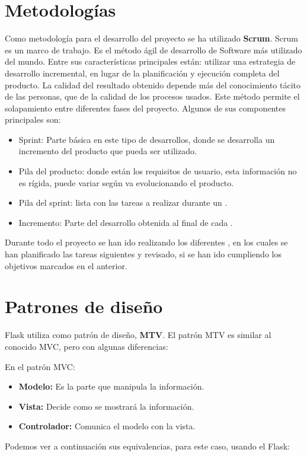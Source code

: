 \section{Metodologías}

Como metodología para el desarrollo del proyecto se ha utilizado \textbf {Scrum}.
Scrum es un marco de trabajo. Es el método ágil de desarrollo de Software más utilizado del mundo.
Entre sus características principales están:
utilizar una estrategia de desarrollo incremental, en lugar de la planificación y ejecución completa del producto. 
La calidad del resultado obtenido depende más del conocimiento tácito de las personas, que de la calidad de los procesos usados. 
Este método permite el solapamiento entre diferentes fases del proyecto.
Algunos de sus componentes principales son: 
\begin{itemize}
\item{Sprint:} Parte básica en este tipo de desarrollos, donde se desarrolla un incremento del producto que pueda ser utilizado.
\item{Pila del producto:} donde están los requisitos de usuario, esta información no es rígida, puede variar según va evolucionando el producto.
\item{Pila del sprint:} lista con las tareas a realizar durante un .
\item{Incremento:} Parte del desarrollo obtenida al final de cada .
\end{itemize}
Durante todo el proyecto se han ido realizando los diferentes , en los cuales se han planificado las tareas siguientes y revisado, si se han ido cumpliendo los objetivos marcados en el  anterior.


\section{Patrones de diseño}

Flask utiliza como patrón de diseño, \textbf {MTV}.
El patrón MTV es similar al conocido MVC, pero con algunas diferencias:

En el patrón MVC:
\begin{itemize}
\item\textbf{Modelo:} Es la parte que manipula la información.
\item\textbf{Vista:} Decide como se mostrará la información.
\item\textbf{Controlador:} Comunica el modelo con la vista.
\end{itemize}
Podemos ver a continuación sus equivalencias, para este caso, usando el  Flask:


